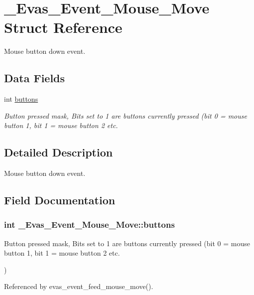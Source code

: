 \section{\_\-Evas\_\-Event\_\-Mouse\_\-Move Struct Reference}
\label{struct__Evas__Event__Mouse__Move}


Mouse button down event.  


\subsection*{Data Fields}
\begin{DoxyCompactItemize}
\item 
int \hyperlink{struct__Evas__Event__Mouse__Move_a455bf48e5f7badcc6c525162e0997d08}{buttons}
\begin{DoxyCompactList}\small\item\em Button pressed mask, Bits set to 1 are buttons currently pressed (bit 0 = mouse button 1, bit 1 = mouse button 2 etc. \item\end{DoxyCompactList}\end{DoxyCompactItemize}


\subsection{Detailed Description}
Mouse button down event. 

\subsection{Field Documentation}
\subsubsection[{buttons}]{\setlength{\rightskip}{0pt plus 5cm}int {\bf \_\-Evas\_\-Event\_\-Mouse\_\-Move::buttons}}\label{struct__Evas__Event__Mouse__Move_a455bf48e5f7badcc6c525162e0997d08}


Button pressed mask, Bits set to 1 are buttons currently pressed (bit 0 = mouse button 1, bit 1 = mouse button 2 etc. 

) 

Referenced by evas\_\-event\_\-feed\_\-mouse\_\-move().

